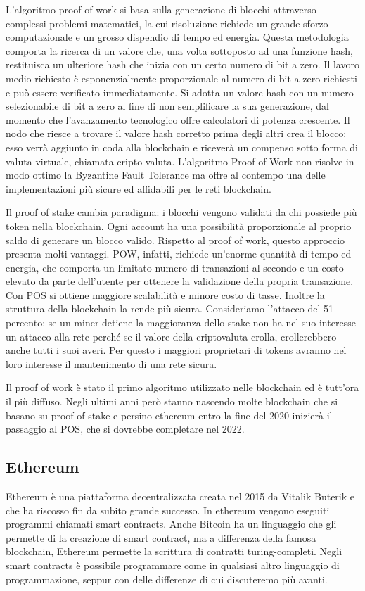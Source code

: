 L’algoritmo proof of work si basa sulla generazione di blocchi attraverso complessi problemi matematici, la cui risoluzione richiede un grande sforzo computazionale e un grosso dispendio di tempo ed energia.
Questa metodologia comporta la ricerca di un valore che, una volta sottoposto ad una funzione hash, restituisca un ulteriore hash che inizia con un certo numero di bit a zero. Il lavoro medio richiesto è esponenzialmente proporzionale al numero di bit a zero richiesti e può essere verificato immediatamente. Si adotta un valore hash con un numero selezionabile di bit a zero al fine di non semplificare la sua generazione, dal momento che l’avanzamento tecnologico offre calcolatori di potenza crescente. Il nodo che riesce a trovare il valore hash corretto prima degli altri crea il blocco: esso verrà aggiunto in coda alla blockchain e riceverà
un compenso sotto forma di valuta virtuale, chiamata cripto-valuta. L’algoritmo Proof-of-Work non risolve in modo ottimo la Byzantine Fault Tolerance ma offre al contempo una delle implementazioni più sicure ed affidabili per le reti blockchain.

Il proof of stake cambia paradigma: i blocchi vengono validati da chi possiede più token nella blockchain. Ogni account ha una possibilità proporzionale al proprio saldo di generare un blocco valido. Rispetto al proof of work, questo approccio presenta molti vantaggi. POW, infatti, richiede un'enorme quantità di tempo ed energia, che comporta un limitato numero di transazioni al secondo e un costo elevato da parte dell’utente per ottenere la validazione della propria transazione. Con POS si ottiene maggiore scalabilità e minore costo di tasse.
Inoltre la struttura della blockchain la rende più sicura. Consideriamo l’attacco del 51 percento: se un miner detiene la maggioranza dello stake non ha nel suo interesse un attacco alla rete perché se il valore della criptovaluta crolla, crollerebbero anche tutti i suoi averi. Per questo i maggiori proprietari di tokens avranno nel loro interesse il mantenimento di una rete sicura.

Il proof of work è stato il primo algoritmo utilizzato nelle blockchain ed è tutt’ora il più diffuso. Negli ultimi anni però stanno nascendo molte blockchain che si basano su proof of stake e persino ethereum entro la fine del 2020 inizierà il passaggio al POS, che si dovrebbe completare nel 2022.

\subsection{Ethereum}
Ethereum è una piattaforma decentralizzata creata nel 2015 da Vitalik Buterik e che ha riscosso fin da subito grande successo. In ethereum vengono eseguiti programmi chiamati smart contracts. Anche Bitcoin ha un linguaggio che gli permette di la creazione di smart contract, ma a differenza della famosa blockchain, Ethereum permette la scrittura di contratti turing-completi. Negli smart contracts è possibile programmare come in qualsiasi altro linguaggio di programmazione, seppur con delle differenze di cui discuteremo più avanti.

